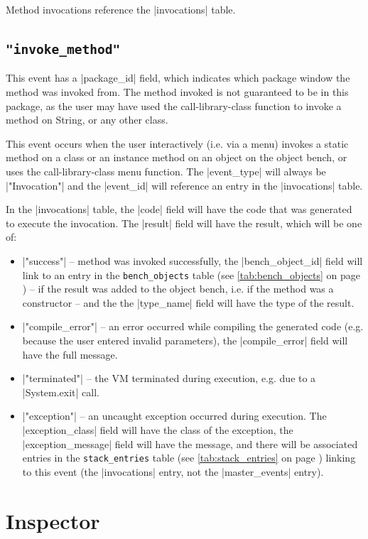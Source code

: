 \documentclass{report}
\newcommand{\myref}[1]{\autoref{#1} on page \pageref*{#1}}
\newcommand{\tabref}[1]{\lstinline|#1| table (see \myref{tab:#1})}
\begin{document}
Method invocations reference the |invocations| table.


\subsection{\lstinline!"invoke_method"!}

This event has a |package_id| field, which indicates which package window the
method was invoked from.  The method invoked is not guaranteed to be in this
package, as the user may have used the call-library-class function to invoke a
method on String, or any other class.

This event occurs when the user interactively (i.e. via a menu) invokes a
static method on a class or an instance method on an object on the object
bench, or uses the call-library-class menu function.  The |event_type| will
always be |"Invocation"| and the |event_id| will reference an entry in the
|invocations| table.  

In the |invocations| table, the |code| field will have the code that was generated
to execute the invocation.  The |result| field will have the result, which will be one of:

\begin{itemize}
\item |"success"| -- method was invoked successfully, the |bench_object_id|
  field will link to an entry in the \tabref{bench_objects} -- if the result was added to the
  object bench, i.e. if the method was a constructor -- and the the |type_name|
  field will have the type of the result.
\item |"compile_error"| -- an error occurred while compiling the generated code
  (e.g. because the user entered invalid parameters), the |compile_error|
  field will have the full message.
\item |"terminated"| -- the VM terminated during execution, e.g. due to a
  |System.exit| call.
\item |"exception"| -- an uncaught exception occurred during execution.  The
  |exception_class| field will have the class of the exception, the
  |exception_message| field will have the message, and there will be
  associated entries in the \tabref{stack_entries} linking to this event (the
  |invocations| entry, not the |master_events| entry).
\end{itemize}

\section{Inspector}
\end{document}
